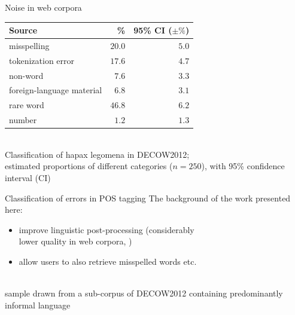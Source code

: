 \documentclass{beamer}
\begin{document}
\begin{frame}
  {Noise in web corpora}
  \begin{center}
    
    \begin{tabular}{lrr}
      Source & \% & 95\% CI ($\pm\%$)\\
      \hline
      misspelling               & $20.0$ & $5.0$\\
      tokenization error        & $17.6$ & $4.7$\\
      non-word                  &  $7.6$ & $3.3$\\
      foreign-language material &  $6.8$ & $3.1$\\
      \hline
      rare word & $46.8$ & $6.2$ \\
      number    &  $1.2$ & $1.3$ \\
    \end{tabular}\\

    \vspace{0.3cm}
    {\tiny Classification of hapax legomena in DECOW2012;\\
    estimated proportions of different categories ($n=250$), with 95\% confidence interval (CI)\\
    \cite{SchaeferBildhauer2013}}
  \end{center}
\end{frame}

\begin{frame}
  {Classification of errors in POS tagging}
  The background of the work presented here:
  \begin{itemize}
    \item improve linguistic post-processing (considerably\\
      lower quality in web corpora, \citealp{GiesbrechtEvert2009})
    \item allow users to also retrieve misspelled words etc.
  \end{itemize}
  \begin{center}
    \\

    \vspace{0.3cm}
    {\tiny sample drawn from a sub-corpus of DECOW2012 containing predominantly informal language}
  \end{center}
\end{frame}
\end{document}

